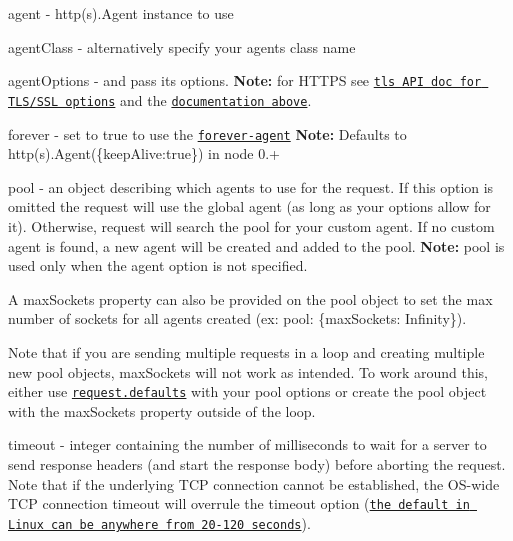 \begin{DoxyItemize}
\item {\ttfamily agent} -\/ {\ttfamily http(s).Agent} instance to use
\item {\ttfamily agent\+Class} -\/ alternatively specify your agent\textquotesingle{}s class name
\item {\ttfamily agent\+Options} -\/ and pass its options. {\bfseries Note\+:} for H\+T\+T\+PS see \href{http://nodejs.org/api/tls.html#tls_tls_connect_options_callback}{\tt tls A\+PI doc for T\+L\+S/\+S\+SL options} and the \href{#using-optionsagentoptions}{\tt documentation above}.
\item {\ttfamily forever} -\/ set to {\ttfamily true} to use the \href{https://github.com/request/forever-agent}{\tt forever-\/agent} {\bfseries Note\+:} Defaults to {\ttfamily http(s).Agent(\{keep\+Alive\+:true\})} in node 0.+
\item {\ttfamily pool} -\/ an object describing which agents to use for the request. If this option is omitted the request will use the global agent (as long as your options allow for it). Otherwise, request will search the pool for your custom agent. If no custom agent is found, a new agent will be created and added to the pool. {\bfseries Note\+:} {\ttfamily pool} is used only when the {\ttfamily agent} option is not specified.
\begin{DoxyItemize}
\item A {\ttfamily max\+Sockets} property can also be provided on the {\ttfamily pool} object to set the max number of sockets for all agents created (ex\+: {\ttfamily pool\+: \{max\+Sockets\+: Infinity\}}).
\item Note that if you are sending multiple requests in a loop and creating multiple new {\ttfamily pool} objects, {\ttfamily max\+Sockets} will not work as intended. To work around this, either use \href{#requestdefaultsoptions}{\tt {\ttfamily request.\+defaults}} with your pool options or create the pool object with the {\ttfamily max\+Sockets} property outside of the loop.
\end{DoxyItemize}
\item {\ttfamily timeout} -\/ integer containing the number of milliseconds to wait for a server to send response headers (and start the response body) before aborting the request. Note that if the underlying T\+CP connection cannot be established, the O\+S-\/wide T\+CP connection timeout will overrule the {\ttfamily timeout} option (\href{http://www.sekuda.com/overriding_the_default_linux_kernel_20_second_tcp_socket_connect_timeout}{\tt the default in Linux can be anywhere from 20-\/120 seconds}).
\end{DoxyItemize}






